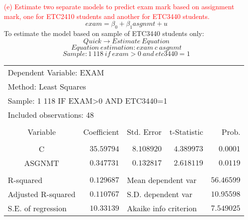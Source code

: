 \documentclass[12pt]{report}
\begin{document}
\newpage
\noindent \textcolor{red}{(e) Estimate two separate models to predict exam mark based on assignment mark, one for ETC2410 students and another for ETC3440 students.}
$$exam = \beta_0 + \beta_1asgnmt + u$$
\noindent To estimate the model  based on sample of ETC3440 students only:
$$Quick \to Estimate\ Equation$$
$$Equation\ estimation: exam\ c\ asgnmt$$
$$Sample: 1\ 118\ if\ exam>0\ and\ etc3440=1$$
\begin{figure}[H]
	\centering
\end{figure}
\vspace{-\baselineskip}
\begin{table}[H]
	\centering
	\begin{tabular}{lrrrr}
		\multicolumn{3}{l}{Dependent Variable: EXAM}&\multicolumn{1}{c}{}&\multicolumn{1}{c}{}\\
		\multicolumn{3}{l}{Method: Least Squares}&\multicolumn{1}{c}{}&\multicolumn{1}{c}{}\\
		\multicolumn{4}{l}{Sample: 1 118 IF EXAM\textgreater 0 AND ETC3440=1}&\multicolumn{1}{c}{}\\
		\multicolumn{3}{l}{Included observations: 48}&\multicolumn{1}{c}{}&\multicolumn{1}{c}{}\\
		[4.5pt] \hline \\ [-4.5pt]
		\multicolumn{1}{c}{Variable}&\multicolumn{1}{r}{Coefficient}&\multicolumn{1}{r}{Std. Error}&\multicolumn{1}{r}{t-Statistic}&\multicolumn{1}{r}{Prob.}\\
		[4.5pt] \hline \\ [-4.5pt]
		\multicolumn{1}{c}{C}&\multicolumn{1}{r}{$35.59794$}&\multicolumn{1}{r}{$8.108920$}&\multicolumn{1}{r}{$4.389973$}&\multicolumn{1}{r}{$0.0001$}\\
		\multicolumn{1}{c}{ASGNMT}&\multicolumn{1}{r}{$0.347731$}&\multicolumn{1}{r}{$0.132817$}&\multicolumn{1}{r}{$2.618119$}&\multicolumn{1}{r}{$0.0119$}\\
		[4.5pt] \hline \\ [-4.5pt]
		\multicolumn{1}{l}{R-squared}&\multicolumn{1}{r}{$0.129687$}&\multicolumn{2}{l}{Mean dependent var}&\multicolumn{1}{r}{$56.46599$}\\
		\multicolumn{1}{l}{Adjusted R-squared}&\multicolumn{1}{r}{$0.110767$}&\multicolumn{2}{l}{S.D. dependent var}&\multicolumn{1}{r}{$10.95598$}\\
		\multicolumn{1}{l}{S.E. of regression}&\multicolumn{1}{r}{$10.33139$}&\multicolumn{2}{l}{Akaike info criterion}&\multicolumn{1}{r}{$7.549025$}\\

\end{tabular}
\end{table}
\end{document}
